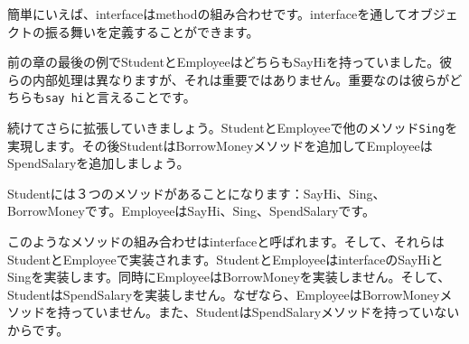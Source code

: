 簡単にいえば、interfaceはmethodの組み合わせです。interfaceを通してオブジェクトの振る舞いを定義することができます。

前の章の最後の例でStudentとEmployeeはどちらもSayHiを持っていました。彼らの内部処理は異なりますが、それは重要ではありません。重要なのは彼らがどちらも\texttt{say hi}と言えることです。

続けてさらに拡張していきましょう。StudentとEmployeeで他のメソッド\texttt{Sing}を実現します。その後StudentはBorrowMoneyメソッドを追加してEmployeeはSpendSalaryを追加しましょう。

Studentには３つのメソッドがあることになります：SayHi、Sing、BorrowMoneyです。EmployeeはSayHi、Sing、SpendSalaryです。

このようなメソッドの組み合わせはinterfaceと呼ばれます。そして、それらはStudentとEmployeeで実装されます。StudentとEmployeeはinterfaceのSayHiとSingを実装します。同時にEmployeeはBorrowMoneyを実装しません。そして、StudentはSpendSalaryを実装しません。なぜなら、EmployeeはBorrowMoneyメソッドを持っていません。また、StudentはSpendSalaryメソッドを持っていないからです。

